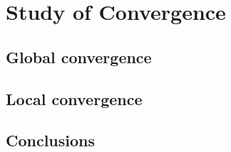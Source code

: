 \section{Study of Convergence}

\subsection{Global convergence}

\subsection{Local convergence}

\subsection{Conclusions}

